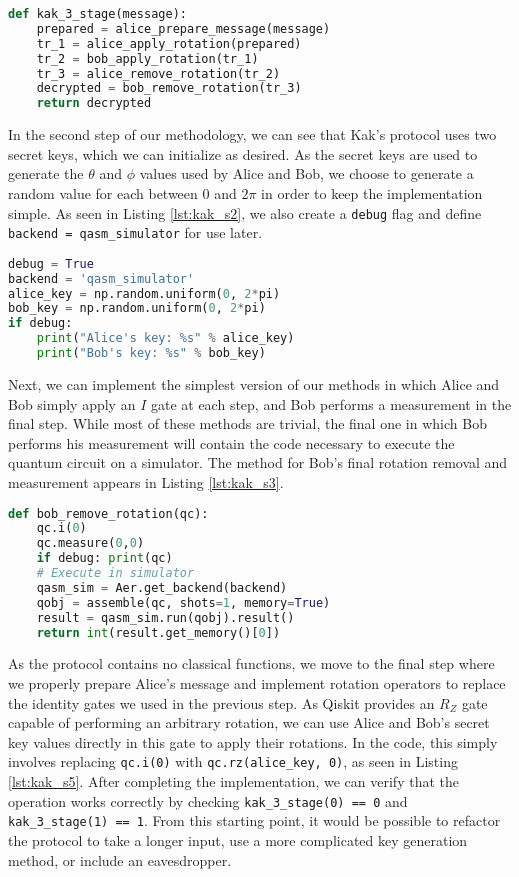\documentclass[sigconf]{acmart}
\begin{document}
\begin{lstlisting}[caption={Implementation of Kak's Three-Stage Protocol, Step 1},label={lst:kak_s1},language=Python]
def kak_3_stage(message):
    prepared = alice_prepare_message(message)
    tr_1 = alice_apply_rotation(prepared)
    tr_2 = bob_apply_rotation(tr_1)
    tr_3 = alice_remove_rotation(tr_2)
    decrypted = bob_remove_rotation(tr_3)
    return decrypted
\end{lstlisting}

In the second step of our methodology, we can see that Kak's protocol uses two secret keys, which we can initialize as desired. As the secret keys are used to generate the $\theta$ and $\phi$ values used by Alice and Bob, we choose to generate a random value for each between 0 and $2\pi$ in order to keep the implementation simple. As seen in Listing \ref{lst:kak_s2}, we also create a \texttt{debug} flag and define \texttt{backend = qasm\_simulator} for use later. 

\begin{lstlisting}[caption={Implementation, Step 2},label={lst:kak_s2},language=Python]
debug = True
backend = 'qasm_simulator'
alice_key = np.random.uniform(0, 2*pi)
bob_key = np.random.uniform(0, 2*pi)
if debug:
    print("Alice's key: %s" % alice_key)
    print("Bob's key: %s" % bob_key)
\end{lstlisting}

Next, we can implement the simplest version of our methods in which Alice and Bob simply apply an $I$ gate at each step, and Bob performs a measurement in the final step. While most of these methods are trivial, the final one in which Bob performs his measurement will contain the code necessary to execute the quantum circuit on a simulator. The method for Bob's final rotation removal and measurement appears in Listing \ref{lst:kak_s3}.

\begin{lstlisting}[caption={Implementation, Step 3 (Partial)},label={lst:kak_s3},language=Python]
def bob_remove_rotation(qc):
    qc.i(0)
    qc.measure(0,0)
    if debug: print(qc)
    # Execute in simulator
    qasm_sim = Aer.get_backend(backend)
    qobj = assemble(qc, shots=1, memory=True)
    result = qasm_sim.run(qobj).result()
    return int(result.get_memory()[0])
\end{lstlisting}

As the protocol contains no classical functions, we move to the final step where we properly prepare Alice's message and implement rotation operators to replace the identity gates we used in the previous step. As Qiskit provides an $R_Z$ gate capable of performing an arbitrary rotation, we can use Alice and Bob's secret key values directly in this gate to apply their rotations. In the code, this simply involves replacing \texttt{qc.i(0)} with \texttt{qc.rz(alice\_key, 0)}, as seen in Listing \ref{lst:kak_s5}. After completing the implementation, we can verify that the operation works correctly by checking \texttt{kak\_3\_stage(0) == 0} and \texttt{kak\_3\_stage(1) == 1}. From this starting point, it would be possible to refactor the protocol to take a longer input, use a more complicated key generation method, or include an eavesdropper.
\end{document}
